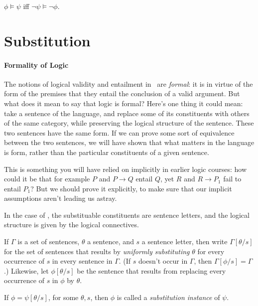 \begin{theorem}[Contraposition]
$\phi \vDash \psi$ iff $\neg \psi \vDash \neg \phi$.
	
\end{theorem}




\section{Substitution}

\paragraph{Formality of Logic} The notions of logical validity and entailment in \lone\ are \emph{formal}: it is in virtue of the form of the premises that they entail the conclusion of a valid argument. But what does it mean to say that logic is formal? Here's one thing it could mean: take a sentence of the language, and replace some of its constituents with others of the same category, while preserving the logical structure of the sentence. These two sentences have the same form. If we can prove some sort of equivalence between the two sentences, we will have shown that what matters in the language is form, rather than the particular constituents of a given sentence. 

This is something you will have relied on implicitly in earlier logic courses: how could it be that for example $P$ and $P\to Q$ entail $Q$, yet $R$ and $R \to P_{1}$ fail to entail $P_{1}$? But we should prove it explicitly, to make sure that our implicit assumptions aren't leading us astray.

In the case of \lone, the substituable constituents are sentence letters, and the logical structure is given by the logical connectives.
\begin{definition}If $\Gamma$ is a set of sentences, $\theta$ a sentence, and $s$ a sentence letter, then write $\Gamma[\theta/s]$ for the set of sentences that results by \emph{uniformly substituting} $\theta$ for every occurrence of $s$ in every sentence in $\Gamma$. (If $s$ doesn't occur in $\Gamma$, then $\Gamma[\phi/s]=\Gamma$.) Likewise, let $\phi[\theta/s]$ be the sentence that results from replacing every occurrence of $s$ in $\phi$ by $\theta$.
\end{definition}

\begin{definition}
	If  $\phi = \psi[\theta/s]$, for some $\theta,s$, then $\phi$ is called a \emph{substitution instance} of $\psi$.
\end{definition}

